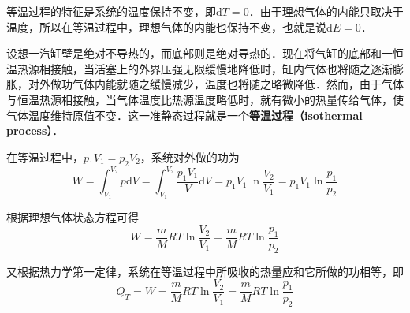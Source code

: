 

等温过程的特征是系统的温度保持不变，即$\mathrm dT=0$．由于理想气体的内能只取决于温度，所以在等温过程中，理想气体的内能也保持不变，也就是说$\mathrm dE=0$．

设想一汽缸壁是绝对不导热的，而底部则是绝对导热的．现在将气缸的底部和一恒温热源相接触，当活塞上的外界压强无限缓慢地降低时，缸内气体也将随之逐渐膨胀，对外做功气体内能就随之缓慢减少，温度也将随之略微降低．然而，由于气体与恒温热源相接触，当气体温度比热源温度略低时，就有微小的热量传给气体，使气体温度维持原值不变．这一准静态过程就是一个\textbf{等温过程（isothermal process）}．

在等温过程中，$p_1V_1=p_2V_2$，系统对外做的功为
\begin{equation}
W= \int_{V_{1}}^{V_{2}} p \mathrm{d} V=\int_{V_{1}}^{V_{2}} \frac{p_{1} V_{1}}{V} \mathrm{d} V=p_{1} V_{1} \ln \frac{V_{2}}{V_{1}}=p_{1} V_{1} \ln \frac{p_{1}}{p_{2}}
\end{equation}

根据理想气体状态方程可得
\begin{equation}
W=\frac{m}{M} R T \ln \frac{V_{2}}{V_{1}}=\frac{m}{M} R T \ln \frac{p_{1}}{p_{2}}
\end{equation}

又根据热力学第一定律，系统在等温过程中所吸收的热量应和它所做的功相等，即
\begin{equation}
Q_{T}=W=\frac{m}{M} R T \ln \frac{V_{2}}{V_{1}}=\frac{m}{M} R T \ln \frac{p_{1}}{p_{2}}
\end{equation}